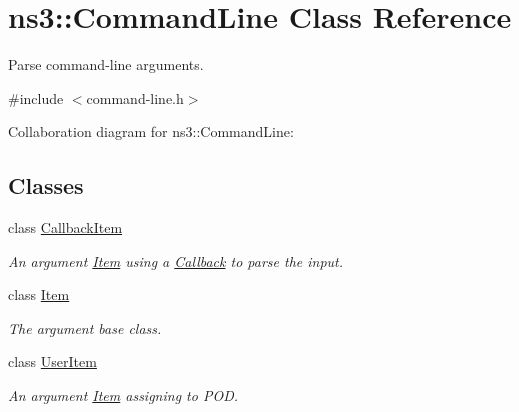 \hypertarget{classns3_1_1CommandLine}{}\section{ns3\+:\+:Command\+Line Class Reference}
\label{classns3_1_1CommandLine}


Parse command-\/line arguments.  




{\ttfamily \#include $<$command-\/line.\+h$>$}



Collaboration diagram for ns3\+:\+:Command\+Line\+:
\subsection*{Classes}
\begin{DoxyCompactItemize}
\item 
class \hyperlink{classns3_1_1CommandLine_1_1CallbackItem}{Callback\+Item}
\begin{DoxyCompactList}\small\item\em An argument \hyperlink{classns3_1_1CommandLine_1_1Item}{Item} using a \hyperlink{classns3_1_1Callback}{Callback} to parse the input. \end{DoxyCompactList}\item 
class \hyperlink{classns3_1_1CommandLine_1_1Item}{Item}
\begin{DoxyCompactList}\small\item\em The argument base class. \end{DoxyCompactList}\item 
class \hyperlink{classns3_1_1CommandLine_1_1UserItem}{User\+Item}
\begin{DoxyCompactList}\small\item\em An argument \hyperlink{classns3_1_1CommandLine_1_1Item}{Item} assigning to P\+OD. \end{DoxyCompactList}\end{DoxyCompactItemize}
